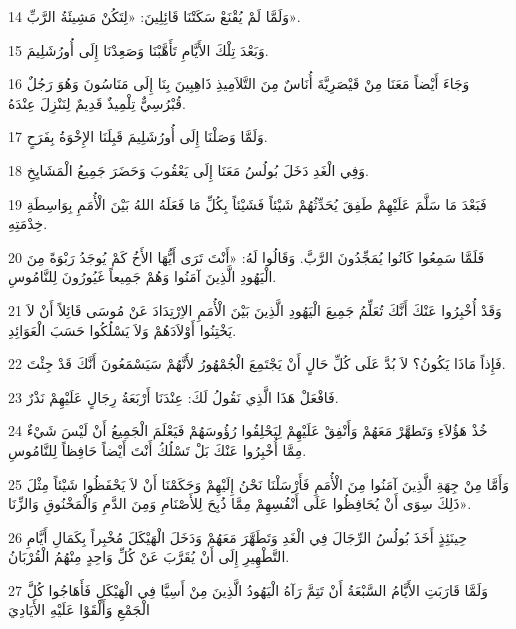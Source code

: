\par 14 وَلَمَّا لَمْ يُقْنَعْ سَكَتْنَا قَائِلِينَ: «لِتَكُنْ مَشِيئَةُ الرَّبِّ».
\par 15 وَبَعْدَ تِلْكَ الأَيَّامِ تَأَهَّبْنَا وَصَعِدْنَا إِلَى أُورُشَلِيمَ.
\par 16 وَجَاءَ أَيْضاً مَعَنَا مِنْ قَيْصَرِيَّةَ أُنَاسٌ مِنَ التَّلاَمِيذِ ذَاهِبِينَ بِنَا إِلَى مَنَاسُونَ وَهُوَ رَجُلٌ قُبْرُسِيٌّ تِلْمِيذٌ قَدِيمٌ لِنَنْزِلَ عِنْدَهُ.
\par 17 وَلَمَّا وَصَلْنَا إِلَى أُورُشَلِيمَ قَبِلَنَا الإِخْوَةُ بِفَرَحٍ.
\par 18 وَفِي الْغَدِ دَخَلَ بُولُسُ مَعَنَا إِلَى يَعْقُوبَ وَحَضَرَ جَمِيعُ الْمَشَايِخِ.
\par 19 فَبَعْدَ مَا سَلَّمَ عَلَيْهِمْ طَفِقَ يُحَدِّثُهُمْ شَيْئاً فَشَيْئاً بِكُلِّ مَا فَعَلَهُ اللهُ بَيْنَ الْأُمَمِ بِوَاسِطَةِ خِدْمَتِهِ.
\par 20 فَلَمَّا سَمِعُوا كَانُوا يُمَجِّدُونَ الرَّبَّ. وَقَالُوا لَهُ: «أَنْتَ تَرَى أَيُّهَا الأَخُ كَمْ يُوجَدُ رَبْوَةً مِنَ الْيَهُودِ الَّذِينَ آمَنُوا وَهُمْ جَمِيعاً غَيُورُونَ لِلنَّامُوسِ.
\par 21 وَقَدْ أُخْبِرُوا عَنْكَ أَنَّكَ تُعَلِّمُ جَمِيعَ الْيَهُودِ الَّذِينَ بَيْنَ الْأُمَمِ الاِرْتِدَادَ عَنْ مُوسَى قَائِلاً أَنْ لاَ يَخْتِنُوا أَوْلاَدَهُمْ وَلاَ يَسْلُكُوا حَسَبَ الْعَوَائِدِ.
\par 22 فَإِذاً مَاذَا يَكُونُ؟ لاَ بُدَّ عَلَى كُلِّ حَالٍ أَنْ يَجْتَمِعَ الْجُمْهُورُ لأَنَّهُمْ سَيَسْمَعُونَ أَنَّكَ قَدْ جِئْتَ.
\par 23 فَافْعَلْ هَذَا الَّذِي نَقُولُ لَكَ: عِنْدَنَا أَرْبَعَةُ رِجَالٍ عَلَيْهِمْ نَذْرٌ.
\par 24 خُذْ هَؤُلاَءِ وَتَطهَّرْ مَعَهُمْ وَأَنْفِقْ عَلَيْهِمْ لِيَحْلِقُوا رُؤُوسَهُمْ فَيَعْلَمَ الْجَمِيعُ أَنْ لَيْسَ شَيْءٌ مِمَّا أُخْبِرُوا عَنْكَ بَلْ تَسْلُكُ أَنْتَ أَيْضاً حَافِظاً لِلنَّامُوسِ.
\par 25 وَأَمَّا مِنْ جِهَةِ الَّذِينَ آمَنُوا مِنَ الْأُمَمِ فَأَرْسَلْنَا نَحْنُ إِلَيْهِمْ وَحَكَمْنَا أَنْ لاَ يَحْفَظُوا شَيْئاً مِثْلَ ذَلِكَ سِوَى أَنْ يُحَافِظُوا عَلَى أَنْفُسِهِمْ مِمَّا ذُبِحَ لِلأَصْنَامِ وَمِنَ الدَّمِ وَالْمَخْنُوقِ وَالزِّنَا».
\par 26 حِينَئِذٍ أَخَذَ بُولُسُ الرِّجَالَ فِي الْغَدِ وَتَطَهَّرَ مَعَهُمْ وَدَخَلَ الْهَيْكَلَ مُخْبِراً بِكَمَالِ أَيَّامِ التَّطْهِيرِ إِلَى أَنْ يُقَرَّبَ عَنْ كُلِّ وَاحِدٍ مِنْهُمُ الْقُرْبَانُ.
\par 27 وَلَمَّا قَارَبَتِ الأَيَّامُ السَّبْعَةُ أَنْ تَتِمَّ رَآهُ الْيَهُودُ الَّذِينَ مِنْ أَسِيَّا فِي الْهَيْكَلِ فَأَهَاجُوا كُلَّ الْجَمْعِ وَأَلْقَوْا عَلَيْهِ الأَيَادِيَ
